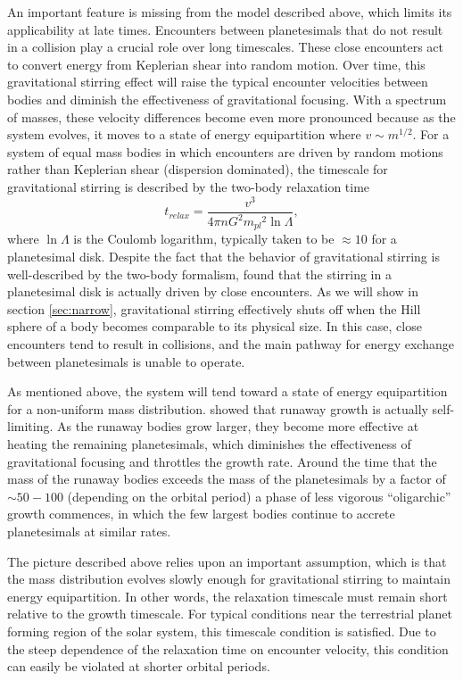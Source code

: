 \documentclass[twocolumn]{aastex63}
\begin{document}
An important feature is missing from the model described above, which
limits its applicability at late times. Encounters between
planetesimals that do not result in a collision play a crucial role
over long timescales. These close encounters act to convert energy
from Keplerian shear into random motion. Over time, this gravitational
stirring effect will raise the typical encounter velocities between
bodies and diminish the effectiveness of gravitational focusing. With
a spectrum of masses, these velocity differences become even more
pronounced because as the system evolves, it moves to a state of
energy equipartition where $v \sim m^{1/2}$. For a system of equal mass bodies in which encounters are driven by random motions rather than Keplerian shear (dispersion dominated), the timescale for gravitational stirring is described by the two-body relaxation time \citep{ida93}
\begin{equation}\label{eq:relax}
	t_{relax} = \frac{v^3}{4 \pi n G^2 {m_{pl}}^2 \ln \Lambda},
\end{equation}
where $\ln \Lambda$ is the Coulomb logarithm,
typically taken to be $\approx 10$ for a planetesimal disk. Despite
the fact that the behavior of gravitational stirring is well-described
by the two-body formalism, \citep{ida93} found that the stirring in a planetesimal disk is actually driven by close encounters. As we will show in section \ref{sec:narrow}, gravitational stirring effectively shuts off when the Hill sphere of a body becomes comparable to its physical size. In this case, close encounters tend to result in collisions, and the main pathway for energy exchange between planetesimals is unable to operate.

As mentioned above, the system will tend toward a state of energy
equipartition for a non-uniform mass distribution. \citet{kokubo98}
showed that runaway growth is actually self-limiting. As the runaway
bodies grow larger, they become more effective at heating the
remaining planetesimals, which diminishes the effectiveness of
gravitational focusing and throttles the growth rate. Around the time
that the mass of the runaway bodies exceeds the mass of the planetesimals
by a factor of $\sim 50-100$ (depending on the orbital period)
\citep{ida93} a phase of less vigorous ``oligarchic'' 
growth commences, in which the few largest bodies continue to 
accrete planetesimals at similar rates.

The picture described above relies upon an important assumption, which
is that the mass distribution evolves slowly enough for gravitational stirring to maintain energy equipartition. In other words, the relaxation timescale must remain short relative to the growth timescale. For typical conditions near the terrestrial planet forming region of the solar system, this timescale condition is satisfied. Due to the steep dependence of the relaxation time on encounter velocity, this condition can easily be violated at shorter orbital periods.
\end{document}
